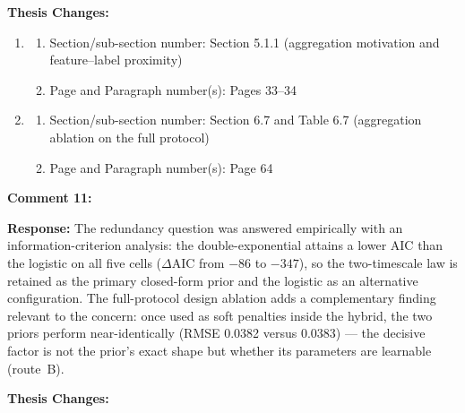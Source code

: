 \documentclass[12pt,a4paper]{article}
\begin{document}
\vspace{\baselineskip}

\textbf{Thesis Changes:}

\begin{enumerate}
    \item
    \begin{enumerate}
        \item Section/sub-section number: Section 5.1.1 (aggregation motivation and feature--label proximity)
        \item Page and Paragraph number(s): Pages 33--34
    \end{enumerate}
    \item
    \begin{enumerate}
        \item Section/sub-section number: Section 6.7 and Table 6.7 (aggregation ablation on the full protocol)
        \item Page and Paragraph number(s): Page 64
    \end{enumerate}
\end{enumerate}

\vspace{\baselineskip}

\textbf{Comment 11:} 

\vspace{\baselineskip}

\textbf{Response:} The redundancy question was answered empirically with an
information-criterion analysis: the double-exponential attains a lower AIC than
the logistic on all five cells ($\Delta$AIC from $-86$ to $-347$), so the
two-timescale law is retained as the primary closed-form prior and the logistic
as an alternative configuration. The full-protocol design ablation adds a
complementary finding relevant to the  concern: once
used as soft penalties inside the hybrid, the two priors perform
near-identically (RMSE 0.0382 versus 0.0383) --- the decisive factor is not
the prior's exact shape but whether its parameters are learnable (route~B).

\vspace{\baselineskip}

\textbf{Thesis Changes:}
\end{document}
